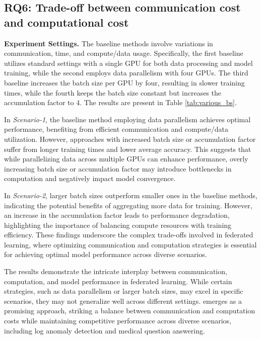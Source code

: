 \documentclass[sigconf]{acmart}
\newcommand\our{\text{FDLoRA}}
\begin{document}
\subsection{RQ6: Trade-off between communication cost and computational cost}
\textbf{Experiment Settings.} The baseline methods involve variations in communication, time, and compute/data usage. Specifically, the first baseline utilizes standard settings with a single GPU for both data processing and model training, while the second employs data parallelism with four GPUs. The third baseline increases the batch size per GPU by four, resulting in slower training times, while the fourth keeps the batch size constant but increases the accumulation factor to 4. The results are present in Table \ref{tab:various_bs}.
\par
In \textit{Scenario-1}, the baseline method employing data parallelism achieves optimal performance, benefiting from efficient communication and compute/data utilization. However, approaches with increased batch size or accumulation factor suffer from longer training times and lower average accuracy. This suggests that while parallelizing data across multiple GPUs can enhance performance, overly increasing batch size or accumulation factor may introduce bottlenecks in computation and negatively impact model convergence.
\par
In \textit{Scenario-2}, larger batch sizes outperform smaller ones in the baseline methods, indicating the potential benefits of aggregating more data for training. However, an increase in the accumulation factor leads to performance degradation, highlighting the importance of balancing compute resources with training efficiency. These findings underscore the complex trade-offs involved in federated learning, where optimizing communication and computation strategies is essential for achieving optimal model performance across diverse scenarios.
\par
The results demonstrate the intricate interplay between communication, computation, and model performance in federated learning. While certain strategies, such as data parallelism or larger batch sizes, may excel in specific scenarios, they may not generalize well across different settings. \our{} emerges as a promising approach, striking a balance between communication and computation costs while maintaining competitive performance across diverse scenarios, including log anomaly detection and medical question answering.
\end{document}
